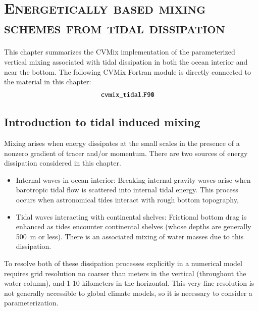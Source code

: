 \chapter{\scshape Energetically based mixing schemes from tidal dissipation}
\label{chapter:cvmix_tidal}

\minitoc
\vspace{.5cm}

This chapter summarizes the CVMix implementation of the parameterized
vertical mixing associated with tidal dissipation in both the ocean
interior and near the bottom.  The following CVMix Fortran module is
directly connected to the material in this chapter:
\begin{align*} 
 &{\tt cvmix\_tidal.F90}
\end{align*}


\section{Introduction to tidal induced mixing}
\label{section:vert_tidal_intro}

Mixing arises when energy dissipates at the small scales in the
presence of a nonzero gradient of tracer and/or momentum.  There are
two sources of energy dissipation considered in this chapter.
\begin{itemize}

\item {\sc Internal waves in ocean interior}: Breaking internal
  gravity waves arise when barotropic tidal flow is scattered into
  internal tidal energy. This process occurs when astronomical tides
  interact with rough bottom topography,

\item {\sc Tidal waves interacting with continental shelves}:
  Frictional bottom drag is enhanced as tides encounter continental
  shelves (whose depths are generally 500~m or less).  There is an
  associated mixing of water masses due to this dissipation.

\end{itemize}
To resolve both of these dissipation processes explicitly in a
numerical model requires grid resolution no coarser than meters in the
vertical (throughout the water column), and 1-10 kilometers in the
horizontal.  This very fine resolution is not generally accessible to
global climate models, so it is necessary to consider a
parameterization.

